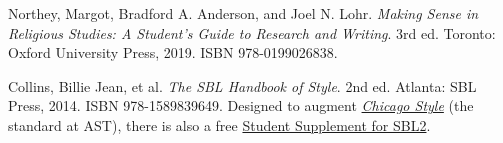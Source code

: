\documentclass[titlepage]{article}
\begin{document}
\begingroup
\renewcommand{\section}[2]{}%
\begin{thebibliography}{Making Sense}%

	 Northey, Margot, Bradford A. Anderson, and Joel N. Lohr.
	\emph{Making Sense in Religious Studies: A Student's Guide to Research and Writing}.
	3rd ed. Toronto: Oxford University Press, 2019. ISBN 978-0199026838.

	 Collins, Billie Jean, et al.
	\emph{The SBL Handbook of Style}.
	2nd ed. Atlanta: SBL Press, 2014. ISBN 978-1589839649.
	Designed to augment \href{http://www.chicagomanualofstyle.org/home.html}{\emph{Chicago Style}}
	(the standard at AST), there is also a free
	\href{https://www.sbl-site.org/wp-content/uploads/2025/04/SBLHSsupp2015-02.pdf}{Student Supplement for SBL2}.

\end{thebibliography}
\endgroup
\end{document}
